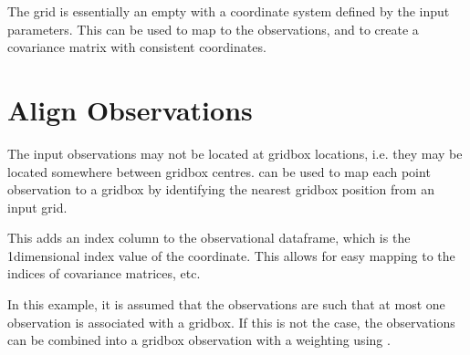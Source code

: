 \documentclass[letterpaper,10pt,english]{sphinxmanual}
\begin{document}
\sphinxAtStartPar
The grid is essentially an empty  with a coordinate system defined by the input
parameters. This can be used to map to the observations, and to create a covariance matrix with
consistent coordinates.

\begin{sphinxVerbatim}[commandchars=\\\{\}]
  
    \PYG{p}{[}   \PYG{p}{]}
    \PYG{p}{[} \PYG{p}{]}
\end{sphinxVerbatim}


\section{Align Observations}
\label{\detokenize{workflow:align-observations}}
\sphinxAtStartPar
The input observations may not be located at grid\sphinxhyphen{}box locations, i.e. they may be located somewhere
between grid\sphinxhyphen{}box centres. {\hyperref[\detokenize{kriging:glomar_gridding.grid.map_to_grid}]{}} can be used to map each point
observation to a grid\sphinxhyphen{}box by identifying the nearest grid\sphinxhyphen{}box position from an input grid.

\sphinxAtStartPar
This adds an index column to the observational data\sphinxhyphen{}frame, which is the 1\sphinxhyphen{}dimensional index value of
the coordinate. This allows for easy mapping to the indices of covariance matrices, etc.

\begin{sphinxVerbatim}[commandchars=\\\{\}]
  
\end{sphinxVerbatim}

\sphinxAtStartPar
In this example, it is assumed that the observations are such that at most one observation is
associated with a grid\sphinxhyphen{}box. If this is not the case, the observations can be combined into a
grid\sphinxhyphen{}box \sphinxhyphen{}observation with a weighting using
{\hyperref[\detokenize{kriging:glomar_gridding.kriging.prep_obs_for_kriging}]{}}.
\end{document}
